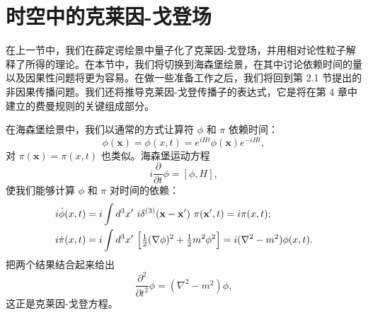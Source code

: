 \section{时空中的克莱因-戈登场}

在上一节中，我们在薛定谔绘景中量子化了克莱因-戈登场，并用相对论性粒子解释了所得的理论。在本节中，我们将切换到海森堡绘景，在其中讨论依赖时间的量以及因果性问题将更为容易。在做一些准备工作之后，我们将回到第 2.1 节提出的非因果传播问题。我们还将推导克莱因-戈登传播子的表达式，它是将在第 4 章中建立的费曼规则的关键组成部分。

在海森堡绘景中，我们以通常的方式让算符 $\phi$ 和 $\pi$ 依赖时间：
\begin{equation}
  \phi(\mathbf{x}) = \phi(x,t) = e^{iHt}\phi(\mathbf{x})e^{-iHt},
  \label{eq:2.43}
\end{equation}
对 $\pi(\mathbf{x}) = \pi(x,t)$ 也类似。海森堡运动方程
\begin{equation}
  i\frac{\partial}{\partial t}\phi = [\phi, H],
  \label{eq:2.44}
\end{equation}
使我们能够计算 $\phi$ 和 $\pi$ 对时间的依赖：
\begin{align}
  i\dot{\phi}(x,t) &= i\int d^3x'\ i\delta^{(3)}(\mathbf{x}-\mathbf{x}')\
    \pi(\mathbf{x}', t) = i\pi(x,t);\\
  i\dot{\pi}(x,t) &= i\int d^3x'\ \Bigl[ \tfrac{1}{2}(\nabla\phi)^2
    + \tfrac{1}{2}m^2\phi^2 \Bigr]
  = i(\nabla^2 - m^2)\phi(x,t).
\end{align}
把两个结果结合起来给出
\begin{equation}
  \frac{\partial^2}{\partial t^2}\phi = (\nabla^2 - m^2)\phi,
  \label{eq:2.45}
\end{equation}
这正是克莱因-戈登方程。

